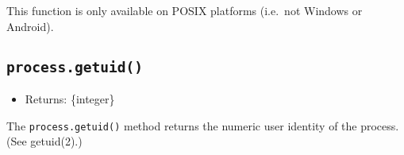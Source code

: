 \begin{Shaded}
\begin{Highlighting}[]
   \OperatorTok{;}

\NormalTok{ (}\NormalTok{) \{}
  \NormalTok{(}\NormalTok{())}\OperatorTok{;} \CommentTok{// [ 16, 21, 297 ]}
\NormalTok{\}}
\end{Highlighting}
\end{Shaded}

\begin{Shaded}
\begin{Highlighting}[]
  \OperatorTok{=} \NormalTok{(}\NormalTok{)}\OperatorTok{;}

\NormalTok{ (}\NormalTok{) \{}
  \NormalTok{(}\NormalTok{())}\OperatorTok{;} \CommentTok{// [ 16, 21, 297 ]}
\NormalTok{\}}
\end{Highlighting}
\end{Shaded}

This function is only available on POSIX platforms (i.e.~not Windows or
Android).

\subsection{\texorpdfstring{\texttt{process.getuid()}}{process.getuid()}}\label{process.getuid}

\begin{itemize}
\tightlist
\item
  Returns: \{integer\}
\end{itemize}

The \texttt{process.getuid()} method returns the numeric user identity
of the process. (See getuid(2).)

\begin{Shaded}
\begin{Highlighting}[]
   \OperatorTok{;}

\NormalTok{ (}\NormalTok{) \{}
  \NormalTok{(}\SpecialCharTok{$\{}\NormalTok{()}\SpecialCharTok{\}}\VerbatimStringTok{\textasciigrave{}}\NormalTok{)}\OperatorTok{;}
\NormalTok{\}}
\end{Highlighting}
\end{Shaded}

